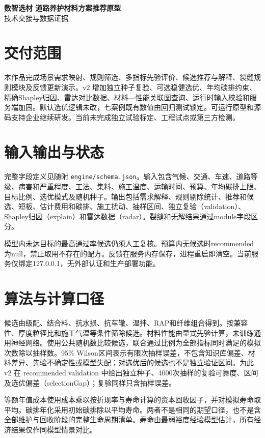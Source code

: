 \documentclass[UTF8,fontset=none,zihao=-4,a4paper]{ctexart}
\begin{document}
\begin{center}{\Large\bfseries\sffamily 数智选材 道路养护材料方案推荐原型}\\[4pt]{\large 技术交接与数据证据}\end{center}
\vspace{2pt}
\section*{交付范围}
本作品完成场景需求映射、规则筛选、多指标先验评价、候选推荐与解释、裂缝规则模块及反馈更新演示。v2 增加独立种子复验、可选稳健选优、年均碳排约束、精确Shapley归因、雷达对比数据、材料—性能关联图查询、运行时输入校验和服务端加固。默认选优逻辑未改，七案例既有数值由回归测试锁定。可运行原型和源码支持企业继续研发。当前未完成独立试验标定、工程试点或第三方检测。

\section*{输入输出与状态}
完整字段定义见随附 \texttt{engine/\allowbreak{}schema.\allowbreak{}json}。输入包含气候、交通、车速、道路等级、病害和严重程度、工法、集料、施工温度、运输时间、预算、年均碳排上限、目标比例、选优模式及随机种子。输出包括需求解释、规则剔除统计、推荐和候选、短板、估计费用和碳排、施工扰动、抽样区间、独立复验（validation）、Shapley归因（explain）和雷达数据（radar）。裂缝和无解结果通过module字段区分。

模型内未达目标的最高通过率候选仍须人工复核。预算内无候选时recommended为null，禁止取用不存在的配方。反馈在服务内存保存，进程重启即清空。当前服务仅绑定127.0.0.1，无外部认证和生产部署功能。

\section*{算法与计算口径}
候选由级配、结合料、抗水损、抗车辙、温拌、RAP和纤维组合得到。按兼容性、厚度粒径比和施工气温等条件筛除候选。材料性能由显式先验计算，未训练通用神经网络。使用公共随机数比较候选，联合通过比例为全部指标同时满足的模拟次数除以抽样数。95\% Wilson区间表示有限次抽样误差，不包含知识库偏差、材料差异、先验不确定性或模型失配；对选优后的候选也不是独立验证区间。为此 v2 在 recommended.validation 中给出独立种子、4000次抽样的复验可靠度、区间及选优偏差（selectionGap）；复验同样只含抽样误差。

等额年值成本使用成本乘以按折现率与寿命计算的资本回收因子，并对模拟寿命取平均。碳排年化采用初始碳排除以平均寿命。两者不是相同的期望口径，也不是含全部维护与回收阶段的完整生命周期清单。寿命由最弱裕度经验模型估计，所有经济结果仅作同模型情景对比。
\end{document}
